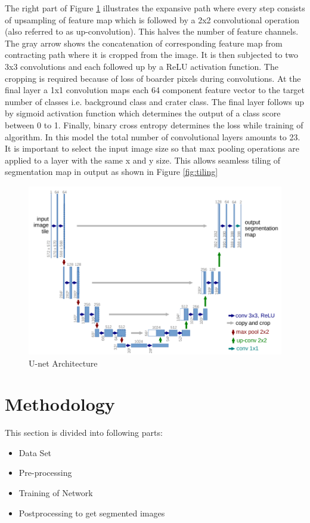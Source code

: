 \documentclass[11pt]{article}
\begin{document}
The right part of Figure \ref{fig:U-net} illustrates the expansive path where every step consists of upsampling of feature map which is followed by a 2x2 convolutional operation (also referred to as up-convolution). This halves the number of feature channels. The gray arrow shows the concatenation of corresponding feature map from contracting path where it is cropped from the image. It is then subjected to two 3x3 convolutions and each followed up by a ReLU activation function. The cropping is required because of loss of boarder pixels during convolutions. At the final layer a 1x1 convolution maps each 64 component feature vector to the target number of classes i.e. background class and crater class. The final layer follows up by sigmoid activation function which determines the output of a class score between 0 to 1. Finally, binary cross entropy determines the loss while training of algorithm. In this model the total number of convolutional layers amounts to 23. It is important to select the input image size so that max pooling operations are applied to a layer with the same x and y size. This allows seamless tiling of segmentation map in output as shown in Figure \ref{fig:tiling}

\begin{figure}[ht!]
	\centering
	\includegraphics[width=.7\linewidth]{files/unet/arch.png}
	\caption{U-net Architecture}
	\label{fig:U-net}
\end{figure} 

\section{Methodology}
This section is divided into following parts:

\begin{itemize}
 \item{Data Set}
 \item{Pre-processing}
 \item{Training of Network}
 \item{Postprocessing to get segmented images}
\end{itemize}
\end{document}
